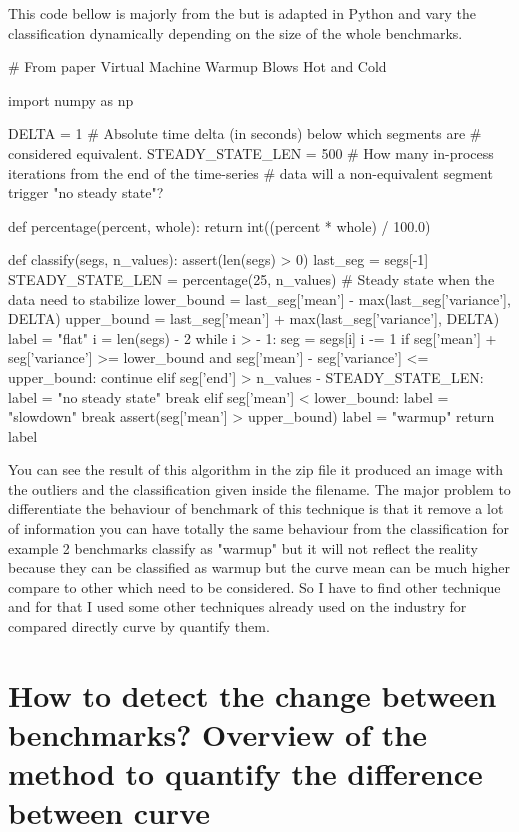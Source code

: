 \documentclass{article}
\begin{document}
This code bellow is majorly from the \cite{barrett2017virtual} but is adapted in Python and vary the classification dynamically depending on the size of the whole benchmarks.
\begin{python}[h!]

# From paper Virtual Machine Warmup Blows Hot and Cold

import numpy as np


DELTA = 1  # Absolute time delta (in seconds) below which segments are
# considered equivalent.
STEADY_STATE_LEN = 500  # How many in-process iterations from the end of the time-series
# data will a non-equivalent segment trigger "no steady state"?


def percentage(percent, whole):
    return int((percent * whole) / 100.0)


def classify(segs, n_values):
    assert(len(segs) > 0)
    last_seg = segs[-1]
    STEADY_STATE_LEN = percentage(25, n_values) # Steady state when the data need to stabilize
    lower_bound = last_seg['mean'] - max(last_seg['variance'], DELTA)
    upper_bound = last_seg['mean'] + max(last_seg['variance'], DELTA)
    label = "flat"
    i = len(segs) - 2
    while i > - 1:
        seg = segs[i]
        i -= 1
        if seg['mean'] + seg['variance'] >= lower_bound and seg['mean'] - seg['variance'] <= upper_bound:
            continue
        elif seg['end'] > n_values - STEADY_STATE_LEN:
            label = "no steady state"
            break
        elif seg['mean'] < lower_bound:
            label = "slowdown"
            break
        assert(seg['mean'] > upper_bound)
        label = "warmup"
    return label
\end{python}

You can see the result of this algorithm in the zip file it produced an image with the outliers and the classification given inside the filename.
The major problem to differentiate the behaviour of benchmark of this technique is that it remove a lot of information you can have totally the same behaviour from the classification for example 2 benchmarks classify as "warmup" but it will not reflect the reality because they can be classified as warmup but the curve mean can be much higher compare to other which need to be considered. So I have to find other technique and for that I used some other techniques already used on the industry for compared directly curve by quantify them.






\section{ How to detect the change between benchmarks? Overview of the method to quantify the difference between curve}
\end{document}
